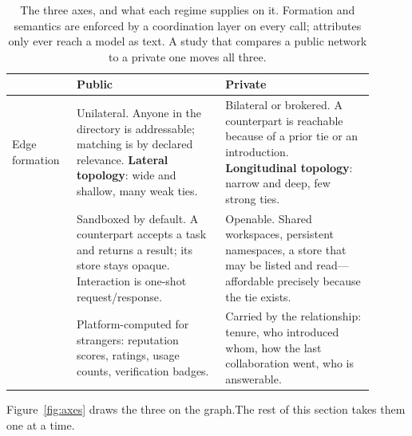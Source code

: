 \begin{table}[t]
\centering\small
\caption{The three axes, and what each regime supplies on it. Formation and semantics
are enforced by a coordination layer on every call; attributes only ever reach a model
as text. A study that compares a public network to a private one moves all three.}
\label{tab:axes}
\begin{tabular}{@{}p{0.155\linewidth}p{0.375\linewidth}p{0.375\linewidth}@{}}
\toprule
& \textbf{Public} & \textbf{Private} \\
\midrule
\arch{Edge\newline formation}
& Unilateral. Anyone in the directory is addressable; matching is by declared
  relevance. \textbf{Lateral topology}: wide and shallow, many weak ties.
& Bilateral or brokered. A counterpart is reachable because of a prior tie or an
  introduction. \textbf{Longitudinal topology}: narrow and deep, few strong ties. \\
\addlinespace[2pt]
\arch{Edge\newline semantics}
& Sandboxed by default. A counterpart accepts a task and returns a result; its store
  stays opaque. Interaction is one-shot request/response.
& Openable. Shared workspaces, persistent namespaces, a store that may be listed and
  read---affordable precisely because the tie exists. \\
\addlinespace[2pt]
\txt{Edge\newline attributes}
& Platform-computed for strangers: reputation scores, ratings, usage counts,
  verification badges.
& Carried by the relationship: tenure, who introduced whom, how the last
  collaboration went, who is answerable. \\
\bottomrule
\end{tabular}
\end{table}

\ifcompact\else Figure~\ref{fig:axes} draws the three on the graph.\fi The rest of this
section takes them one at a time.

\ifcompact
